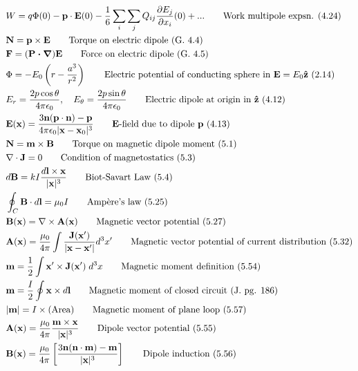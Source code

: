 \documentclass[10pt]{article}
\newcommand{\zhat}{\boldsymbol{\hat{\textbf{z}}}}
\newcommand{\ve}[1]{\boldsymbol{\mathbf{#1}}}
\newcommand{\vect}[1]{\boldsymbol{\mathbf{#1}}}
\newcommand{\eo}{\epsilon_0}
\newcommand{\pder}[2]{\frac{\partial #1}{\partial #2}}
\begin{document}
\begin{multicols}{2}
\begin{align*}
		& W = q \Phi(0) - \vect{p} \cdot \vect{E}(0) - \frac{1}{6} \sum_i \sum_j Q_{ij} \pder{E_j}{x_i}(0) + ... \tag*{Work multipole expsn. (4.24)} \\
		&\ve{N} = \ve{p} \times \ve{E} \tag*{Torque on electric dipole (G. 4.4)} \\
		& \ve{F} = (\ve{P \cdot \nabla}) \ve{E} \tag*{Force on electric dipole (G. 4.5)} \\
		& \Phi = -E_0 \left( r - \frac{a^3}{r^2} \right)	\tag*{Electric potential of conducting sphere in $\vect{E} = E_0 \zhat$ (2.14)} \\
		& E_r=\frac{2 p \cos \theta}{4 \pi \eo}, \quad E_\theta=\frac{2 p \sin \theta}{4 \pi \eo} \tag*{Electric dipole at origin in $\zhat$ (4.12)} \\
		& \vect{E}(\vect{x}) = \frac{3 \vect{n}(\vect{p} \cdot \vect{n}) - \vect{p}}{4 \pi \eo |\vect{x} - \vect{x}_0|^3} \tag*{$\vect{E}$-field due to dipole $\vect{p}$ (4.13)} \\
		& \vect{N} = \vect{m} \times \vect{B} \tag*{Torque on magnetic dipole moment (5.1)} \\
		& \nabla \cdot \vect{J} = 0 \tag*{Condition of magnetostatics (5.3)} \\
		& d \vect{B} = k I \frac{d \vect{l} \times \vect{x}}{|\vect{x}|^3} \tag*{Biot-Savart Law (5.4)} \\
		& \oint_C \vect{B} \cdot d \vect{l} = \mu_0 I \tag*{Amp\`ere's law (5.25)}\\
		& \vect{B}(\vect{x}) = \nabla \times \vect{A}(\vect{x}) \tag*{Magnetic vector potential (5.27)} \\
		& \vect{A}(\vect{x}) = \frac{\mu_0}{4 \pi} \int \frac{\vect{J}(\vect{x}')}{|\vect{x}-\vect{x}'|} d^3 x' \tag*{Magnetic vector potential of current distribution (5.32)} \\
		& \vect{m} = \frac{1}{2} \int \vect{x}' \times \vect{J}(\vect{x}') \; d^3 x \tag*{Magnetic moment definition (5.54)} \\
		& \vect{m} = \frac{I}{2} \oint \vect{x} \times d \vect{l} \tag*{Magnetic moment of closed circuit (J. pg. 186)} \\
		& |\vect{m}| = I \times (\text{Area}) \tag*{Magnetic moment of plane loop (5.57)} \\
		& \vect{A}(\vect{x}) = \frac{\mu_0}{4 \pi} \frac{\vect{m} \times \vect{x}}{|\vect{x}|^3} \tag*{Dipole vector potential (5.55)} \\
		& \vect{B}(\vect{x}) = \frac{\mu_0}{4 \pi} \left[ \frac{3 \vect{n}(\vect{n} \cdot \vect{m}) - \vect{m}}{|\vect{x}|^3} \right]\tag*{Dipole induction (5.56)}\\

\end{align*}
\end{multicols}
\end{document}

